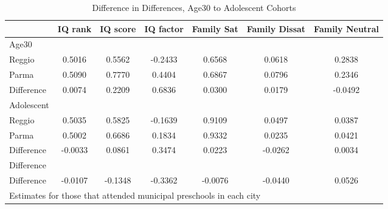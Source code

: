 \begin{table}[htbp]\centering
\caption{Difference in Differences, Age30 to Adolescent Cohorts}
\begin{tabular}{l*{6}{c}}
\hline\hline
            &     IQ rank&    IQ score&   IQ factor&  Family Sat&Family Dissat&Family Neutral\\
\hline
Age30       &            &            &            &            &            &            \\
Reggio      &      0.5016&      0.5562&     -0.2433&      0.6568&      0.0618&      0.2838\\
Parma       &      0.5090&      0.7770&      0.4404&      0.6867&      0.0796&      0.2346\\
Difference  &      0.0074&      0.2209&      0.6836&      0.0300&      0.0179&     -0.0492\\
\hline
Adolescent  &            &            &            &            &            &            \\
Reggio      &      0.5035&      0.5825&     -0.1639&      0.9109&      0.0497&      0.0387\\
Parma       &      0.5002&      0.6686&      0.1834&      0.9332&      0.0235&      0.0421\\
Difference  &     -0.0033&      0.0861&      0.3474&      0.0223&     -0.0262&      0.0034\\
\hline
Difference  &            &            &            &            &            &            \\
Difference  &     -0.0107&     -0.1348&     -0.3362&     -0.0076&     -0.0440&      0.0526\\
\hline\hline
\multicolumn{7}{l}{\footnotesize Estimates for those that attended municipal preschools in each city}\\
\end{tabular}
\end{table}
